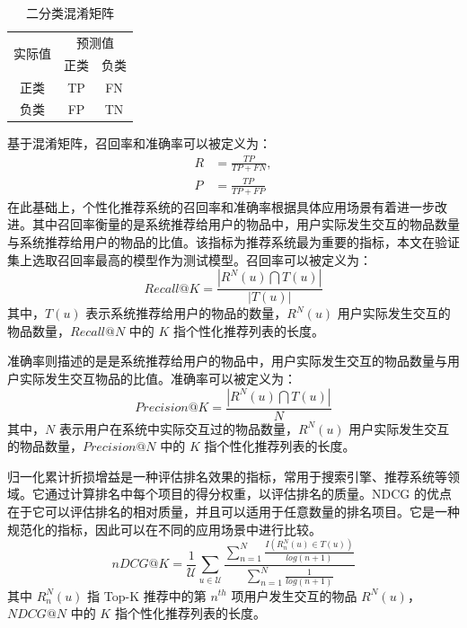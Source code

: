 \begin{table}[htbp]
  \centering
  \caption{二分类混淆矩阵}
  \label{tab:confusion_matrix}
  \begin{tabular}{ccc}
  \hline
  \multirow{2}{*}{实际值} & \multicolumn{2}{c}{预测值} \\ \cline{2-3}
  & 正类 & 负类 \\ \hline
  正类 & TP & FN \\
  负类 & FP & TN \\ \hline
  \end{tabular}
\end{table}
基于混淆矩阵，召回率和准确率可以被定义为：
\begin{equation}
  \begin{aligned}
    R &= \frac{TP}{TP + FN}, \\
    P &= \frac{TP}{TP + FP}
  \end{aligned}
\end{equation}
在此基础上，个性化推荐系统的召回率和准确率根据具体应用场景有着进一步改进。其中召回率衡量的是系统推荐给用户的物品中，用户实际发生交互的物品数量与系统推荐给用户的物品的比值。该指标为推荐系统最为重要的指标，本文在验证集上选取召回率最高的模型作为测试模型。召回率可以被定义为：
\begin{equation}
  Recall@K = \frac{|R^N(u) \bigcap T(u)|}{|T(u)|}
\end{equation}
其中，$T(u)$ 表示系统推荐给用户的物品的数量，$R^N(u)$ 用户实际发生交互的物品数量，$Recall@N$ 中的 $K$ 指个性化推荐列表的长度。

准确率则描述的是是系统推荐给用户的物品中，用户实际发生交互的物品数量与用户实际发生交互物品的比值。准确率可以被定义为：
\begin{equation}
  Precision@K = \frac{|R^N(u) \bigcap T(u)|}{N}
\end{equation}
其中，$N$ 表示用户在系统中实际交互过的物品数量，$R^N(u)$ 用户实际发生交互的物品数量，$Precision@N$ 中的 $K$ 指个性化推荐列表的长度。

归一化累计折损增益是一种评估排名效果的指标，常用于搜索引擎、推荐系统等领域。它通过计算排名中每个项目的得分权重，以评估排名的质量。NDCG 的优点在于它可以评估排名的相对质量，并且可以适用于任意数量的排名项目。它是一种规范化的指标，因此可以在不同的应用场景中进行比较。
\begin{equation}
  nDCG@K = \frac{1}{\mathcal{U}}\sum_{u \in \mathcal{U}} \frac{\sum^N_{n=1} \frac{I(R^N_n(u) \in T(u))}{log(n+1)}}{\sum^N_{n=1}\frac{1}{log(n+1)}}
\end{equation}
其中 $R^N_n(u)$ 指 Top-K 推荐中的第 $n^{th}$ 项用户发生交互的物品 $R^N(u)$，$NDCG@N$ 中的 $K$ 指个性化推荐列表的长度。

